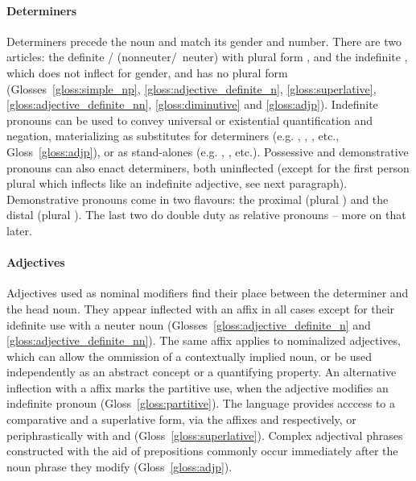 \paragraph{Determiners}
Determiners precede the noun and match its gender and number.
There are two articles: the definite / (nonneuter/~neuter) with plural form , and the indefinite , which does not inflect for gender, and has no plural form (Glosses~\ref{gloss:simple_np}, \ref{gloss:adjective_definite_n}, \ref{gloss:superlative}, \ref{gloss:adjective_definite_nn}, \ref{gloss:diminutive}{} and \ref{gloss:adjp}).
Indefinite pronouns can be used to convey universal or existential quantification and negation, materializing as substitutes for determiners (e.g. , , , etc., Gloss~\ref{gloss:adjp}), or as stand-alones (e.g. , , etc.).
Possessive and demonstrative pronouns can also enact determiners, both uninflected (except for the first person plural  which inflects like an indefinite adjective, see next paragraph).
Demonstrative pronouns come in two flavours: the proximal  (plural ) and the distal  (plural ).
The last two do double duty as relative pronouns -- more on that later.

\paragraph{Adjectives}
Adjectives used as nominal modifiers find their place between the determiner and the head noun.
They appear inflected with an  affix in all cases except for their idefinite use with a neuter noun (Glosses~\ref{gloss:adjective_definite_n} and \ref{gloss:adjective_definite_nn}).
The same affix applies to nominalized adjectives, which can allow the ommission of a contextually implied noun, or be used independently as an abstract concept or a quantifying property.
An alternative inflection with a  affix marks the partitive use, when the adjective modifies an indefinite pronoun (Gloss~\ref{gloss:partitive}).
The language provides acccess to a comparative and a superlative form, via the affixes  and  respectively, or periphrastically with  and  (Gloss~\ref{gloss:superlative}).
Complex adjectival phrases constructed with the aid of prepositions commonly occur immediately after the noun phrase they modify (Gloss~\ref{gloss:adjp}).

